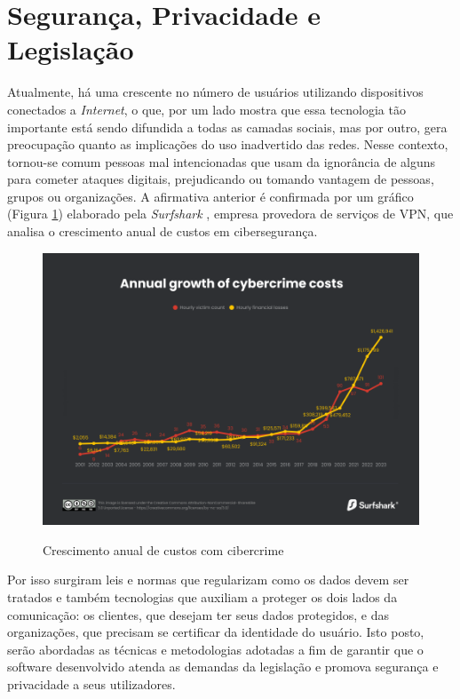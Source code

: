 \section{Segurança, Privacidade e Legislação}
Atualmente, há uma crescente no número de usuários utilizando dispositivos conectados a \textit{Internet}, o que, por um lado mostra que essa tecnologia tão importante está sendo difundida a todas as camadas sociais, mas por outro, gera preocupação quanto as implicações do uso inadvertido das redes.
Nesse contexto, tornou-se comum pessoas mal intencionadas que usam da ignorância de alguns para cometer ataques digitais, prejudicando ou tomando vantagem de pessoas, grupos ou organizações. A afirmativa anterior é confirmada por um gráfico (Figura \ref{fig:cibercrimes}) elaborado pela \emph{Surfshark} \cite{Surfshark}, empresa provedora de serviços de VPN, que analisa o crescimento anual de custos em cibersegurança. 
\begin{figure}[h]
	\centering
	\caption{Crescimento anual de custos com cibercrime}
	\includegraphics[width=1\textwidth]{cap04-desenvolvimento/images/4-6-annual-growth-of-cybercrime-costs.png}
	\label{fig:cibercrimes}
\end{figure}

Por isso surgiram leis e normas que regularizam como os dados devem ser tratados e também tecnologias que auxiliam a proteger os dois lados da comunicação: os clientes, que desejam ter seus dados protegidos, e das organizações, que precisam se certificar da identidade do usuário.
Isto posto, serão abordadas as técnicas e metodologias adotadas a fim de garantir que o software desenvolvido atenda as demandas da legislação e promova segurança e privacidade a seus utilizadores.

